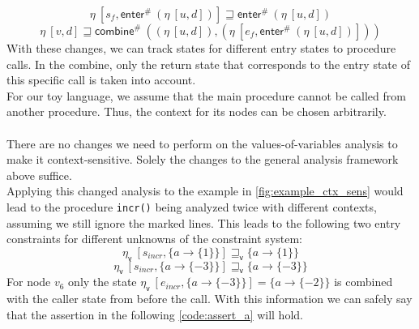     \[\eta\ [s_f, \textsf{enter}^{\#}\ (\eta\ [u, d])] \sqsupseteq \textsf{enter}^{\#}\ (\eta\ [u, d]) \]
    \[\eta\ [v, d] \sqsupseteq \textsf{combine}^{\#}\ ((\eta\ [u, d]), (\eta\ [e_f, \textsf{enter}^{\#}\ (\eta\ [u, d])])) \]
    With these changes, we can track states for different entry states to procedure calls. In the combine, only the return state that corresponds to the entry state of this specific call is taken into account.\\
    For our toy language, we assume that the main procedure cannot be called from another procedure. Thus, the context for its nodes can be chosen arbitrarily.\\
    \\
    There are no changes we need to perform on the values-of-variables analysis to make it context-sensitive. Solely the changes to the general analysis framework above suffice.\\ Applying this changed analysis to the example in \autoref{fig:example_ctx_sens} would lead to the procedure \texttt{incr()} being analyzed twice with different contexts, assuming we still ignore the marked lines. This leads to the following two entry constraints for different unknowns of the constraint system:
    \[\eta_\textsf{v}\ [s_{incr}, \{a \rightarrow \{1\} \}] \sqsupseteq_\textsf{v} \{a \rightarrow \{1\} \} \]
    \[\eta_\textsf{v}\ [s_{incr}, \{a \rightarrow \{-3\} \}] \sqsupseteq_\textsf{v} \{a \rightarrow \{-3\} \} \]
    For node $v_6$ only the state $\eta_\textsf{v}\ [e_{incr}, \{a \rightarrow \{-3\} \}] = \{a \rightarrow \{-2\}\}$ is combined with the caller state from before the call. With this information we can safely say that the assertion in the following \autoref{code:assert_a} will hold.

